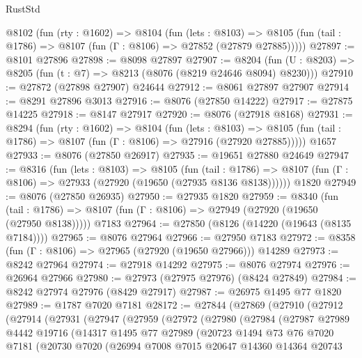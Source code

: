 \begin{lexlean}{RustStd}
\begin{coremodule}
  @8102
    (fun (rty : @1602) =>
    @8104
      (fun (lets : @8103) =>
      @8105 (fun (tail : @1786) => @8107 (fun (Γ : @8106) => @27852 (@27879 @27885)))))
@27897 := @8101 @27896
@27898 := @8098 @27897
@27907 := @8204
    (fun (U : @8203) => @8205 (fun (t : @7) => @8213 (@8076 (@8219 @24646 @8094) @8230)))
@27910 := @27872 (@27898 @27907) @24644
@27912 := @8061 @27897 @27907
@27914 := @8291 @27896 @3013
@27916 := @8076 (@27850 @14222)
@27917 := @27875 @14225
@27918 := @8147 @27917
@27920 := @8076 (@27918 @8168)
@27931 := @8294
    (fun (rty : @1602) =>
    @8104
      (fun (lets : @8103) =>
      @8105 (fun (tail : @1786) => @8107 (fun (Γ : @8106) => @27916 (@27920 @27885)))))
    @1657
@27933 := @8076 (@27850 @26917)
@27935 := @19651 @27880 @24649
@27947 := @8316
    (fun (lets : @8103) =>
    @8105
      (fun (tail : @1786) =>
      @8107 (fun (Γ : @8106) => @27933 (@27920 (@19650 (@27935 @8136 @8138))))))
    @1820
@27949 := @8076 (@27850 @26935)
@27950 := @27935 @1820
@27959 := @8340
    (fun (tail : @1786) => @8107 (fun (Γ : @8106) => @27949 (@27920 (@19650 (@27950 @8138)))))
    @7183
@27964 := @27850 (@8126 (@14220 (@19643 (@8135 @7184))))
@27965 := @8076 @27964
@27966 := @27950 @7183
@27972 := @8358 (fun (Γ : @8106) => @27965 (@27920 (@19650 @27966))) @14289
@27973 := @8242 @27964
@27974 := @27918 @14292
@27975 := @8076 @27974
@27976 := @26964 @27966
@27980 := @27973 (@27975 @27976) (@8424 @27849)
@27984 := @8242 @27974 @27976 (@8429 @27917)
@27987 := @26975 @1495 @77 @1820
@27989 := @1787 @7020 @7181
@28172 := @27844
    (@27869
      (@27910
        (@27912
          (@27914
            (@27931
              (@27947
                (@27959
                  (@27972
                    (@27980
                      (@27984
                        (@27987
                          @27989
                          @4442
                          @19716
                          (@14317
                            @1495
                            @77
                            @27989
                            (@20723
                              @1494
                              @73
                              @76
                              @7020
                              @7181
                              (@20730
                                @7020
                                (@26994
                                  @7008
                                  @7015
                                  @20647
                                  @14360
                                  @14364
                                  @20743

\end{coremodule}
\end{lexlean}
